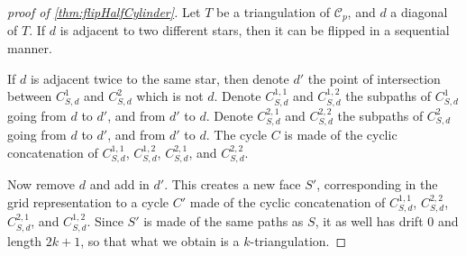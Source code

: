 \documentclass{amsart}
\theoremstyle{remark}
\begin{document}
\begin{proof}[proof of \cref{thm:flipHalfCylinder}]
Let $T$ be a triangulation of $\mathcal{C}_p$, and $d$ a diagonal of $T$.
If $d$ is adjacent to two different stars, then it can be flipped in a sequential manner.

If $d$ is adjacent twice to the same star, then denote $d'$ the point of intersection between $C_{S,d}^1$ and $C_{S,d}^2$ which is not $d$.
Denote $C_{S,d}^{1,1}$ and $C_{S,d}^{1,2}$ the subpaths of $C_{S,d}^1$ going from $d$ to $d'$, and from $d'$ to $d$.
Denote $C_{S,d}^{2,1}$ and $C_{S,d}^{2,2}$ the subpaths of $C_{S,d}^2$ going from $d$ to $d'$, and from $d'$ to $d$.
The cycle $C$ is made of the cyclic concatenation of $C_{S,d}^{1,1}$, $C_{S,d}^{1,2}$, $C_{S,d}^{2,1}$, and $C_{S,d}^{2,2}$.

Now remove $d$ and add in $d'$. This creates a new face $S'$, corresponding in the grid representation to a cycle $C'$ made of the cyclic concatenation of $C_{S,d}^{1,1}$, $C_{S,d}^{2,2}$, $C_{S,d}^{2,1}$, and $C_{S,d}^{1,2}$.
Since $S'$ is made of the same paths as $S$, it as well has drift $0$ and length $2k+1$, so that what we obtain is a $k$-triangulation.
\end{proof}
\end{document}
